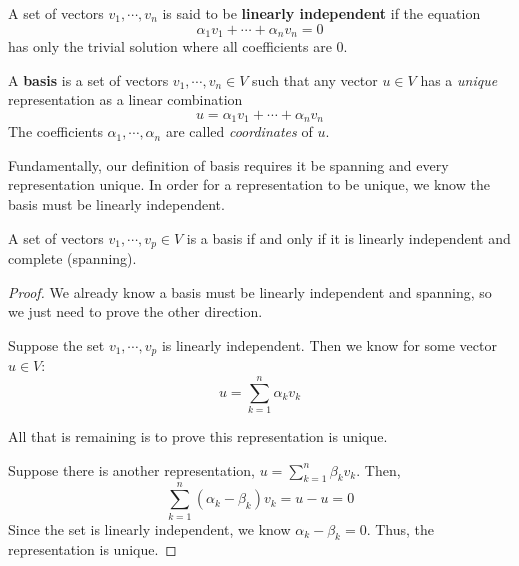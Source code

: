 \begin{definition}
A set of vectors $v_{1}, \cdots, v_{n}$ is said to be \textbf{linearly independent} if the equation 
$$\alpha_{1} v_{1} + \cdots + \alpha_{n} v_{n} = 0$$
has only the trivial solution where all coefficients are 0. 
\end{definition}

\begin{definition}
A \textbf{basis} is a set of vectors $v_{1}, \cdots , v_{n} \in V$ such that any vector $u \in V$ has a \textit{unique} representation as a linear combination 
$$u = \alpha_{1} v_{1} + \cdots + \alpha_{n} v_{n}$$
The coefficients $\alpha_{1}, \cdots, \alpha_{n}$ are called \textit{coordinates} of $u$.
\end{definition}

Fundamentally, our definition of basis requires it be spanning and every representation unique. In order for a representation to be unique, we know the basis must be linearly independent. 

\begin{theorem}
A set of vectors $v_{1}, \cdots, v_{p} \in V$ is a basis if and only if it is linearly independent and complete (spanning). 
\end{theorem}

\begin{proof}
We already know a basis must be linearly independent and spanning, so we just need to prove the other direction. 

Suppose the set $v_{1}, \cdots, v_{p}$ is linearly independent. Then we know for some vector $u \in V$:
$$u = \sum_{k=1}^{n} \alpha_{k} v_{k}$$

All that is remaining is to prove this representation is unique. 

Suppose there is another representation, $u = \sum_{k=1}^{n} \beta_{k} v_{k}$. Then, 
$$\sum_{k=1}^{n} (\alpha_{k} - \beta_{k}) v_{k} = u - u = 0$$
Since the set is linearly independent, we know $\alpha_{k} - \beta_{k} = 0$. Thus, the representation is unique. 
\end{proof}

